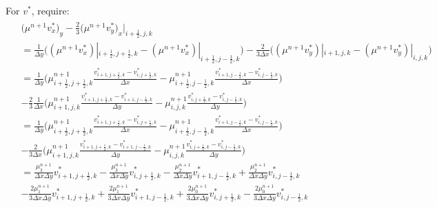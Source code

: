 \documentclass{article}
\numberwithin{equation}{subsection}
\begin{document}
For $v^*$, require:
\begin{align}
\begin{split}
& \Big(\mu^{n+1} v^*_x \Big)_y - \frac{2}{3} \Big( \mu^{n+1} v^*_y \Big)_x |_{i+\frac{1}{2},j,k} \\
& = \frac{1}{\Delta y} \Big( (\mu^{n+1} v^*_x)|_{i+\frac{1}{2},j+\frac{1}{2},k} - (\mu^{n+1}v^*_x)|_{i+\frac{1}{2},j-\frac{1}{2},k}\Big) - \frac{2}{3 \Delta x} \Big( (\mu^{n+1}v^*_y)|_{i+1,j,k} - (\mu^{n+1}v^*_y)|_{i,j,k}\Big) \\
& = \frac {1}{\Delta y} \Big ( \mu^{n+1}_{i+\frac{1}{2},j+\frac{1}{2},k}\frac{v^*_{i+1,j+\frac{1}{2},k} - v^*_{i,j+\frac{1}{2},k}}{\Delta x} - \mu^{n+1}_{i+\frac{1}{2},j-\frac{1}{2},k}\frac{v^*_{i+1,j-\frac{1}{2},k} - v^*_{i,j-\frac{1}{2},k}}{\Delta x} \Big) \\
& - \frac{2}{3}\frac{1}{\Delta x} \Big( \mu^{n+1}_{i+1,j,k}\frac{v^*_{i+1,j+\frac{1}{2},k} - v^*_{i+1,j-\frac{1}{2},k}}{\Delta y} - \mu^{n+1}_{i,j,k}\frac{v^*_{i,j+\frac{1}{2},k} - v^*_{i,j-\frac{1}{2},k}}{\Delta y} \Big)\\
& = \frac{1}{\Delta y}\Big(\mu^{n+1}_{i+\frac{1}{2},j+\frac{1}{2},k}\frac{v^*_{i+1,j+\frac{1}{2},k}-v^*_{i,j+\frac{1}{2},k}}{\Delta x} - \mu^{n+1}_{i+\frac{1}{2},j-\frac{1}{2},k}\frac{v^*_{i+1,j-\frac{1}{2},k} - v^*_{i,j-\frac{1}{2},k}}{\Delta x}\Big) \\
& - \frac{2}{3\Delta x}\Big(\mu^{n+1}_{i+1,j,k}\frac{v^*_{i+1,j+\frac{1}{2},k} - v^*_{i+1,j-\frac{1}{2},k}}{\Delta y} - \mu^{n+1}_{i,j,k}\frac{v^*_{i,j+\frac{1}{2},k} - v^*_{i,j-\frac{1}{2},k}}{\Delta y}\Big) \\
& = \frac{\mu^{n+1}_3}{\Delta x \Delta y}v^*_{i+1,j+\frac{1}{2},k} - \frac{\mu^{n+1}_3}{\Delta x \Delta y}v^*_{i,j+\frac{1}{2},k} -\frac{\mu^{n+1}_2}{\Delta x \Delta y}v^*_{i+1,j-\frac{1}{2},k} + \frac{\mu^{n+1}_2}{\Delta x \Delta y}v^*_{i,j-\frac{1}{2},k} \\
& - \frac{2\mu^{n+1}_1}{3\Delta x \Delta y}v^*_{i+1,j+\frac{1}{2},k} + \frac{2\mu^{n+1}_1}{3\Delta x \Delta y}v^*_{i+1,j-\frac{1}{2},k} + \frac{2\mu^{n+1}_0}{3\Delta x \Delta y}v^*_{i,j+\frac{1}{2},k} -\frac{2\mu^{n+1}_0}{3\Delta x \Delta y}v^*_{i,j-\frac{1}{2},k}
\end{split}
\end{align}
\end{document}
